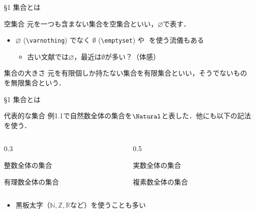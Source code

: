\documentclass[uplatex,a4paper,dvipdfmx,aspectratio=169,11pt]{beamer}
\begin{document}
\begin{frame}[fragile]{\S 1 集合とは}
    \begin{block}{空集合}
        元を一つも含まない集合を\alert{空集合}といい，$\varnothing$で表す．
    \end{block}
    \begin{itemize}
        \item $\varnothing$ (\texttt{\textbackslash varnothing}) でなく $\emptyset$ (\texttt{\textbackslash emptyset}) や $\qty{}$ を使う流儀もある
            \begin{itemize}
                \item 古い文献では$\varnothing$，最近は$\emptyset$が多い？（体感）
            \end{itemize}
    \end{itemize}
    \medskip

    \begin{block}{集合の大きさ}
        元を有限個しか持たない集合を\alert{有限集合}といい，そうでないものを\alert{無限集合}という．
    \end{block}
\end{frame}

\begin{frame}[fragile]{\S 1 集合とは}
    \begin{block}{代表的な集合}
        例1.1で自然数全体の集合を$\Natural$と表した．他にも以下の記法を使う．
        \begin{columns}
            \begin{column}{0.3\linewidth}
                \begin{description}[$\Integer$:]
                    \item[$\Integer$:] 整数全体の集合
                    \item[$\Rational$:] 有理数全体の集合
                \end{description}
            \end{column}
            \begin{column}{0.5\linewidth}
                \begin{description}[$\Integer$:]
                    \item[$\Real$:] 実数全体の集合
                    \item[$\Complex$:] 複素数全体の集合
                \end{description}
            \end{column}
        \end{columns}
    \end{block}

    \begin{itemize}
        \item 黒板太字（$\mathbb N, \mathbb Z, \mathbb R$など）を使うことも多い
    \end{itemize}
\end{frame}
\end{document}
